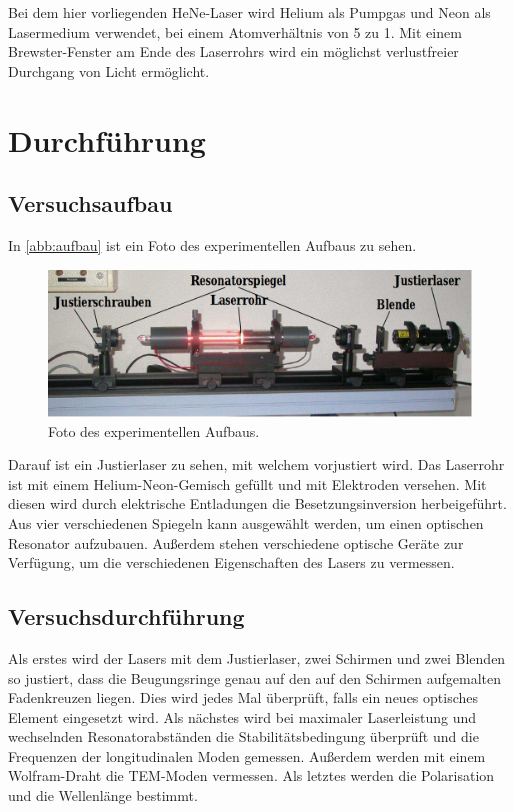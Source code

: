 Bei dem hier vorliegenden HeNe-Laser wird Helium als Pumpgas und Neon als Lasermedium
verwendet, bei einem Atomverhältnis von 5 zu 1. Mit einem Brewster-Fenster am Ende
des Laserrohrs wird ein möglichst verlustfreier Durchgang von Licht ermöglicht.

\section{Durchführung}
\subsection{Versuchsaufbau}
In \autoref{abb:aufbau} ist ein Foto des experimentellen Aufbaus zu sehen.
\begin{figure}
  \centering
  \includegraphics[scale=0.4]{content/pics/aufbau.png}
  \caption{Foto des experimentellen Aufbaus.}
  \label{abb:aufbau}
\end{figure}
Darauf ist ein Justierlaser zu sehen, mit welchem vorjustiert wird. Das Laserrohr
ist mit einem Helium-Neon-Gemisch gefüllt und mit Elektroden versehen. Mit diesen
wird durch elektrische Entladungen die Besetzungsinversion herbeigeführt. Aus vier
verschiedenen Spiegeln kann ausgewählt werden, um einen optischen Resonator aufzubauen.
Außerdem stehen verschiedene optische Geräte zur Verfügung, um die verschiedenen
Eigenschaften des Lasers zu vermessen.

\subsection{Versuchsdurchführung}
Als erstes wird der Lasers mit dem Justierlaser, zwei Schirmen und zwei Blenden
so justiert, dass die Beugungsringe genau auf den auf den Schirmen aufgemalten
Fadenkreuzen liegen. Dies wird jedes Mal überprüft, falls ein neues optisches Element
eingesetzt wird. Als nächstes wird bei maximaler Laserleistung und wechselnden Resonatorabständen
die Stabilitätsbedingung überprüft und die Frequenzen der longitudinalen
Moden gemessen. Außerdem werden mit einem Wolfram-Draht die
TEM-Moden vermessen. Als letztes werden die Polarisation und die Wellenlänge bestimmt.

